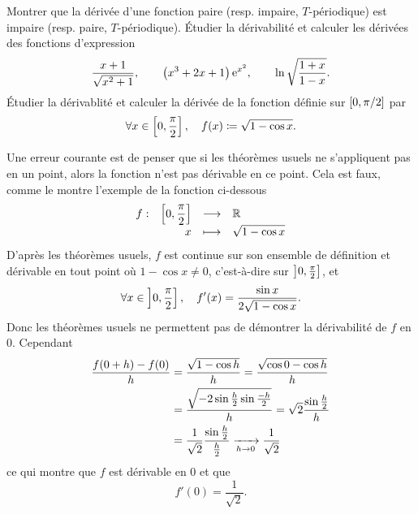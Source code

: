 \documentclass{magnolia}
\begin{document}
\begin{exos}
\exo Montrer que la dérivée d'une fonction paire (resp. impaire, $T$-périodique) est impaire (resp. paire, $T$-périodique).
\exo Étudier la dérivabilité et calculer les dérivées des fonctions
  d'expression
  \[\frac{x+1}{\sqrt{x^2+1}}, \qquad \left(x^3+2x+1\right){\rm e}^{x^2}, \qquad \ln\sqrt{\frac{1+x}{1-x}}.\]
\exo Étudier la dérivablité et calculer la dérivée de la fonction
  définie sur $\left[0,\pi/2\right]$ par
  \[\forall x\in\left[0,\frac{\pi}{2}\right] ,\quad 
    f(x)\coloneqq\sqrt{1-\cos x}.\]
  \begin{sol}
  Une erreur courante est de penser que si les théorèmes usuels ne
  s'appliquent pas en un point, alors la fonction n'est pas dérivable en ce
  point. Cela est faux, comme le montre l'exemple de la fonction ci-dessous
  \[\begin{array}[t]{lrcl} \displaystyle{f} : & \displaystyle{\left[0,\frac{\pi}{2}\right]} & \longrightarrow & \displaystyle{\mathbb{R}} \\ & \displaystyle{x} & \longmapsto & \displaystyle{\sqrt{1-\cos x}} \end{array}\]
  D'après les théorèmes usuels, $f$ est continue sur son ensemble de définition
  et dérivable en tout point où $1-\cos x\not=0$, c'est-à-dire sur
  $\left]0,\frac{\pi}{2}\right]$, et
  $$\forall x\in\left]0,\frac{\pi}{2}\right] ,\quad f'(x)=
    \frac{\sin x}{2\sqrt{1-\cos x}}.$$
  Donc les théorèmes usuels ne permettent pas de démontrer la dérivabilité de
  $f$ en $0$. Cependant
  \begin{equation*}
  \begin{split}
  \frac{f(0+h)-f(0)}{h} &=\frac{\sqrt{1-\cos h}}{h} =
                          \frac{\sqrt{\cos 0-\cos h}}{h}\\
                        &=\frac{\sqrt{-2\sin\frac{h}{2}\sin\frac{-h}{2}}}{h}=
                          \sqrt{2}\frac{\sin\frac{h}{2}}{h}\\
                        &=\frac{1}{\sqrt{2}}\frac{\sin\frac{h}{2}}{\frac{h}{2}}
                          \xrightarrow[h\rightarrow 0]{} \frac{1}{\sqrt{2}}
  \end{split}
  \end{equation*}
  ce qui montre que $f$ est dérivable en $0$ et que
  $$f'(0)=\frac{1}{\sqrt{2}}.$$    
  \end{sol}
\end{exos}
\end{document}
